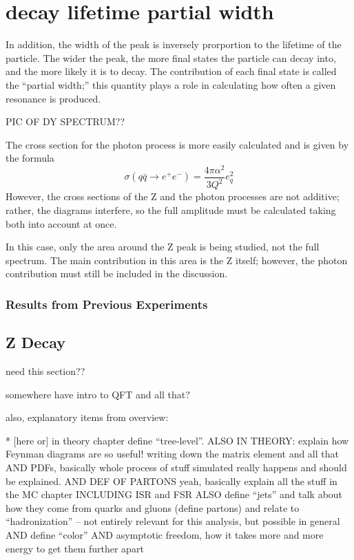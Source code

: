 \section{decay lifetime partial width}
In addition, the width of the peak is inversely prorportion to the   %
lifetime of the particle.  
The wider the peak, the more final states the particle can decay into, 
and the more likely it is to decay.  
The contribution of each final state is called the 
``partial width;'' 
this quantity plays a role in calculating 
how often a given resonance is produced.  

PIC OF DY SPECTRUM??


The cross section for the photon process 
is more easily calculated and is given by the formula
\[
\sigma(q \bar{q} \rightarrow e^+ e^-) 
= \frac{4 \pi \alpha^2}{3 Q^2} e_q^2
\]
However, the cross sections of the Z and the photon 
processes are not additive; 
rather, the diagrams interfere, 
so the full amplitude must be calculated taking 
both into account at once.  

In this case, only the area around the Z peak is being 
studied, not the full spectrum.  
The main contribution in this area is the Z itself; 
however, the photon contribution must still be included 
in the discussion.  


\subsubsection{Results from Previous Experiments}
\label{theory:prev}

\subsection{Z Decay}
\label{theory:Zdec}
need this section??


somewhere have intro to QFT and all that?  

also, explanatory items from overview:

   * [here or] in theory chapter define ``tree-level''.  
ALSO IN THEORY: explain how Feynman diagrams are so useful! 
writing down the matrix element and all that
AND PDFs, basically whole process of stuff simulated 
really happens and should be explained.  
AND DEF OF PARTONS
yeah, basically explain all the stuff in the MC chapter
INCLUDING ISR and FSR
ALSO define ``jets'' and talk about how they come from 
quarks and gluons (define partons) and relate to ``hadronization'' -- 
not entirely relevant for this analysis, 
but possible in general
AND define ``color''
AND asymptotic freedom, how it takes more and more energy to get them further apart

